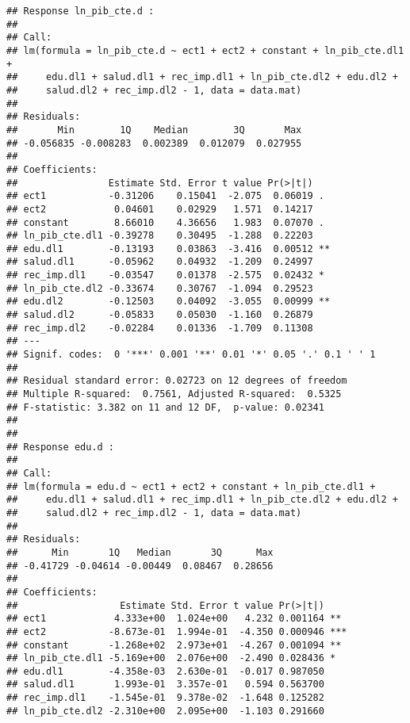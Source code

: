 \documentclass[]{book}
\newenvironment{Shaded}{\begin{snugshade}}{\end{snugshade}}
\newcommand{\KeywordTok}[1]{\textcolor[rgb]{0.13,0.29,0.53}{\textbf{#1}}}
\newcommand{\OperatorTok}[1]{\textcolor[rgb]{0.81,0.36,0.00}{\textbf{#1}}}
\newcommand{\NormalTok}[1]{#1}
\theoremstyle{definition}
\theoremstyle{definition}
\theoremstyle{definition}
\theoremstyle{remark}
\begin{document}
\begin{Shaded}
\end{Shaded}

\begin{verbatim}
## Response ln_pib_cte.d :
## 
## Call:
## lm(formula = ln_pib_cte.d ~ ect1 + ect2 + constant + ln_pib_cte.dl1 + 
##     edu.dl1 + salud.dl1 + rec_imp.dl1 + ln_pib_cte.dl2 + edu.dl2 + 
##     salud.dl2 + rec_imp.dl2 - 1, data = data.mat)
## 
## Residuals:
##       Min        1Q    Median        3Q       Max 
## -0.056835 -0.008283  0.002389  0.012079  0.027955 
## 
## Coefficients:
##                Estimate Std. Error t value Pr(>|t|)   
## ect1           -0.31206    0.15041  -2.075  0.06019 . 
## ect2            0.04601    0.02929   1.571  0.14217   
## constant        8.66010    4.36656   1.983  0.07070 . 
## ln_pib_cte.dl1 -0.39278    0.30495  -1.288  0.22203   
## edu.dl1        -0.13193    0.03863  -3.416  0.00512 **
## salud.dl1      -0.05962    0.04932  -1.209  0.24997   
## rec_imp.dl1    -0.03547    0.01378  -2.575  0.02432 * 
## ln_pib_cte.dl2 -0.33674    0.30767  -1.094  0.29523   
## edu.dl2        -0.12503    0.04092  -3.055  0.00999 **
## salud.dl2      -0.05833    0.05030  -1.160  0.26879   
## rec_imp.dl2    -0.02284    0.01336  -1.709  0.11308   
## ---
## Signif. codes:  0 '***' 0.001 '**' 0.01 '*' 0.05 '.' 0.1 ' ' 1
## 
## Residual standard error: 0.02723 on 12 degrees of freedom
## Multiple R-squared:  0.7561, Adjusted R-squared:  0.5325 
## F-statistic: 3.382 on 11 and 12 DF,  p-value: 0.02341
## 
## 
## Response edu.d :
## 
## Call:
## lm(formula = edu.d ~ ect1 + ect2 + constant + ln_pib_cte.dl1 + 
##     edu.dl1 + salud.dl1 + rec_imp.dl1 + ln_pib_cte.dl2 + edu.dl2 + 
##     salud.dl2 + rec_imp.dl2 - 1, data = data.mat)
## 
## Residuals:
##      Min       1Q   Median       3Q      Max 
## -0.41729 -0.04614 -0.00449  0.08467  0.28656 
## 
## Coefficients:
##                  Estimate Std. Error t value Pr(>|t|)    
## ect1            4.333e+00  1.024e+00   4.232 0.001164 ** 
## ect2           -8.673e-01  1.994e-01  -4.350 0.000946 ***
## constant       -1.268e+02  2.973e+01  -4.267 0.001094 ** 
## ln_pib_cte.dl1 -5.169e+00  2.076e+00  -2.490 0.028436 *  
## edu.dl1        -4.358e-03  2.630e-01  -0.017 0.987050    
## salud.dl1       1.993e-01  3.357e-01   0.594 0.563700    
## rec_imp.dl1    -1.545e-01  9.378e-02  -1.648 0.125282    
## ln_pib_cte.dl2 -2.310e+00  2.095e+00  -1.103 0.291660    

\end{verbatim}
\end{document}
